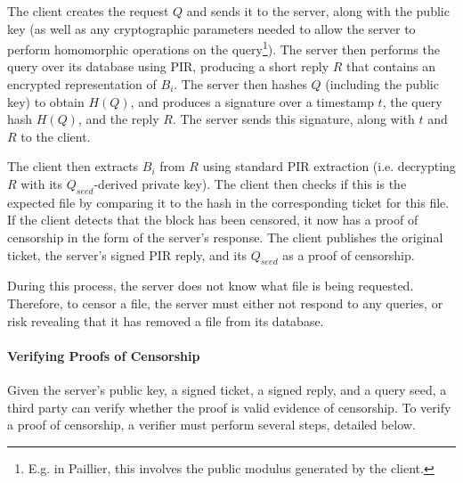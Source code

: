 The client creates the request $Q$ and sends it to the server, along with 
the public key (as well as any
cryptographic parameters needed to allow the server to perform homomorphic
operations on the query\footnote{E.g. in Paillier, this involves the public
modulus generated by the client.}). The server then performs the query over its
database using PIR, producing a short reply $R$ that contains an encrypted
representation of $B_i$. The server then hashes $Q$ (including the public key) to obtain $H(Q)$, and
produces a signature over a timestamp $t$, the query hash $H(Q)$, and the reply
$R$. The server sends this signature, along with $t$ and $R$ to the client.

The client then extracts $B_i$ from $R$ using standard PIR extraction (i.e.
decrypting $R$ with its $Q_{seed}$-derived private key). The client then checks if this is the
expected file by comparing it to the hash in the corresponding ticket for this
file.
If the client detects that the block has been censored, it now has a proof of
censorship in the form of the server's response. The client publishes the
original ticket, the server's signed PIR reply, and its $Q_{seed}$ as a proof of
censorship.


During this process, the server does not know what file is being
requested. Therefore, to censor a file, the server must either not respond to
any queries, or risk revealing that it has removed a file from its database.

\paragraph{Verifying Proofs of Censorship}
Given the server's public key, a signed ticket, a signed reply, and a query
seed, a third
party can verify whether the proof is valid evidence of censorship. To verify a
proof of censorship, a verifier must perform several steps, detailed below.

